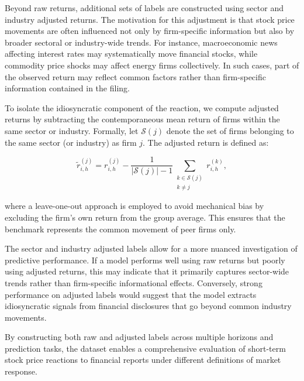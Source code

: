 Beyond raw returns, additional sets of labels are constructed using sector and industry adjusted returns. The motivation for this adjustment is that stock price movements are often influenced not only by firm-specific information but also by broader sectoral or industry-wide trends. For instance, macroeconomic news affecting interest rates may systematically move financial stocks, while commodity price shocks may affect energy firms collectively. In such cases, part of the observed return may reflect common factors rather than firm-specific information contained in the filing.

To isolate the idiosyncratic component of the reaction, we compute adjusted returns by subtracting the contemporaneous mean return of firms within the same sector or industry. Formally, let $\mathcal{S}(j)$ denote the set of firms belonging to the same sector (or industry) as firm $j$. The adjusted return is defined as:

\begin{equation}
\tilde{r}_{i,h}^{(j)} = r_{i,h}^{(j)} - 
\frac{1}{|\mathcal{S}(j)| - 1}
\sum_{\substack{k \in \mathcal{S}(j) \\ k \neq j}} r_{i,h}^{(k)},
\end{equation}

where a leave-one-out approach is employed to avoid mechanical bias by excluding the firm's own return from the group average. This ensures that the benchmark represents the common movement of peer firms only.

The sector and industry adjusted labels allow for a more nuanced investigation of predictive performance. If a model performs well using raw returns but poorly using adjusted returns, this may indicate that it primarily captures sector-wide trends rather than firm-specific informational effects. Conversely, strong performance on adjusted labels would suggest that the model extracts idiosyncratic signals from financial disclosures that go beyond common industry movements.

By constructing both raw and adjusted labels across multiple horizons and prediction tasks, the dataset enables a comprehensive evaluation of short-term stock price reactions to financial reports under different definitions of market response.